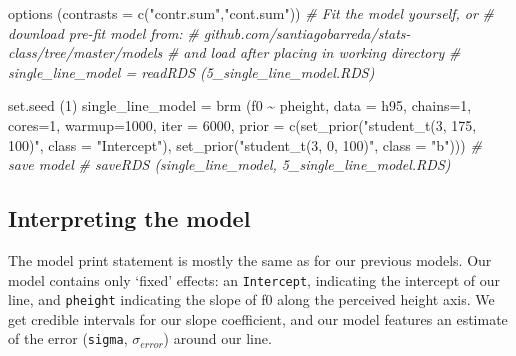 \documentclass[
]{book}
\newenvironment{Shaded}{\begin{snugshade}}{\end{snugshade}}
\newcommand{\AttributeTok}[1]{\textcolor[rgb]{0.77,0.63,0.00}{#1}}
\newcommand{\CommentTok}[1]{\textcolor[rgb]{0.56,0.35,0.01}{\textit{#1}}}
\newcommand{\DecValTok}[1]{\textcolor[rgb]{0.00,0.00,0.81}{#1}}
\newcommand{\FunctionTok}[1]{\textcolor[rgb]{0.00,0.00,0.00}{#1}}
\newcommand{\NormalTok}[1]{#1}
\newcommand{\OtherTok}[1]{\textcolor[rgb]{0.56,0.35,0.01}{#1}}
\newcommand{\SpecialCharTok}[1]{\textcolor[rgb]{0.00,0.00,0.00}{#1}}
\newcommand{\StringTok}[1]{\textcolor[rgb]{0.31,0.60,0.02}{#1}}
\begin{document}
\begin{Shaded}
\begin{Highlighting}[]
\FunctionTok{options}\NormalTok{ (}\AttributeTok{contrasts =} \FunctionTok{c}\NormalTok{(}\StringTok{"contr.sum"}\NormalTok{,}\StringTok{"cont.sum"}\NormalTok{))}
\CommentTok{\# Fit the model yourself, or}
\CommentTok{\# download pre{-}fit model from: }
\CommentTok{\# github.com/santiagobarreda/stats{-}class/tree/master/models}
\CommentTok{\# and load after placing in working directory}
\CommentTok{\# single\_line\_model = readRDS (\textquotesingle{}5\_single\_line\_model.RDS\textquotesingle{})}

\FunctionTok{set.seed}\NormalTok{ (}\DecValTok{1}\NormalTok{)}
\NormalTok{single\_line\_model }\OtherTok{=}
  \FunctionTok{brm}\NormalTok{ (f0 }\SpecialCharTok{\textasciitilde{}}\NormalTok{ pheight, }\AttributeTok{data =}\NormalTok{ h95, }\AttributeTok{chains=}\DecValTok{1}\NormalTok{, }\AttributeTok{cores=}\DecValTok{1}\NormalTok{,  }\AttributeTok{warmup=}\DecValTok{1000}\NormalTok{, }\AttributeTok{iter =} \DecValTok{6000}\NormalTok{,}
       \AttributeTok{prior =} \FunctionTok{c}\NormalTok{(}\FunctionTok{set\_prior}\NormalTok{(}\StringTok{"student\_t(3, 175, 100)"}\NormalTok{, }\AttributeTok{class =} \StringTok{"Intercept"}\NormalTok{),}
                 \FunctionTok{set\_prior}\NormalTok{(}\StringTok{"student\_t(3, 0, 100)"}\NormalTok{, }\AttributeTok{class =} \StringTok{"b"}\NormalTok{)))}
\CommentTok{\# save model}
\CommentTok{\# saveRDS (single\_line\_model, \textquotesingle{}5\_single\_line\_model.RDS\textquotesingle{})}
\end{Highlighting}
\end{Shaded}

\hypertarget{interpreting-the-model-2}{%
\subsection{Interpreting the model}\label{interpreting-the-model-2}}

The model print statement is mostly the same as for our previous models. Our model contains only `fixed' effects: an \texttt{Intercept}, indicating the intercept of our line, and \texttt{pheight} indicating the slope of f0 along the perceived height axis. We get credible intervals for our slope coefficient, and our model features an estimate of the error (\texttt{sigma}, \(\sigma_{error}\)) around our line.
\end{document}
